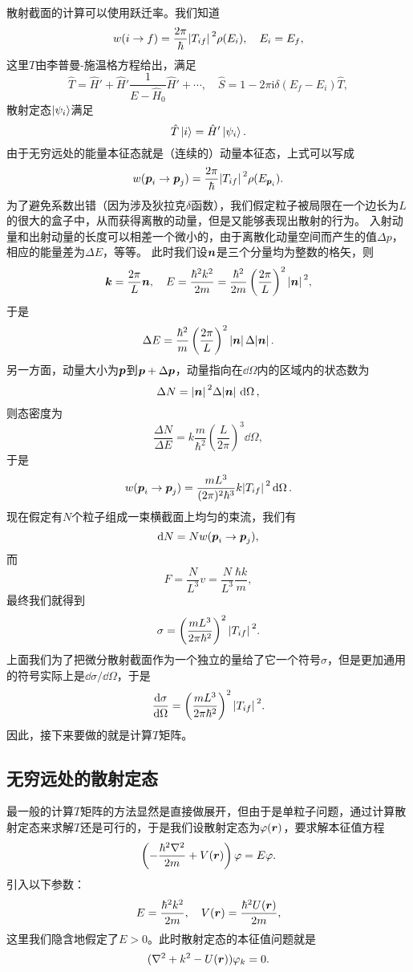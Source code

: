 \documentclass[UTF8, a4paper]{ctexart}
\newcommand*{\ii}{\mathrm{i}}
\begin{document}
散射截面的计算可以使用跃迁率。我们知道
\[
    w(i \to f) = \frac{2\pi}{\hbar} \abs*{T_{if}}^2 \rho(E_i), \quad E_i = E_f,
\]
这里$T$由李普曼-施温格方程给出，满足
\[
    \hat{T} = \hat{H}' + \hat{H}' \frac{1}{E - \hat{H}_0} \hat{H}' + \cdots, \quad \hat{S} = 1 - 2 \pi \ii \delta(E_f - E_i) \hat{T},
\]
散射定态$\ket{\psi_i}$满足
\[
    \hat{T} \ket{i} = \hat{H}' \ket{\psi_i}.
\]
由于无穷远处的能量本征态就是（连续的）动量本征态，上式可以写成
\[
    w(\vb*{p}_i \to \vb*{p}_j) = \frac{2\pi}{\hbar} \abs*{T_{if}}^2 \rho(E_{\vb*{p}_i}).
\]
为了避免系数出错（因为涉及狄拉克$\delta$函数），我们假定粒子被局限在一个边长为$L$的很大的盒子中，从而获得离散的动量，但是又能够表现出散射的行为。
入射动量和出射动量的长度可以相差一个微小的，由于离散化动量空间而产生的值$\Delta p$，相应的能量差为$\Delta E$，等等。
此时我们设$\vb*{n}$是三个分量均为整数的格矢，则
\[
    \vb*{k} = \frac{2\pi}{L} \vb*{n}, \quad E = \frac{\hbar^2 k^2}{2m} = \frac{\hbar^2}{2m} \left( \frac{2\pi}{L} \right)^2 \abs*{\vb*{n}}^2,
\]
于是
\[
    \Delta E = \frac{\hbar^2}{m} \left( \frac{2\pi}{L} \right)^2 \abs*{\vb*{n}} \Delta \abs*{\vb*{n}}.
\]
另一方面，动量大小为$\vb*{p}$到$\vb*{p}+\Delta \vb*{p}$，动量指向在$\dd{\Omega}$内的区域内的状态数为
\[
    \Delta N = \abs*{\vb*{n}}^2 \Delta \abs*{\vb*{n}} \dd{\Omega},
\]
则态密度为
\[
    \frac{\Delta N}{\Delta E} = k \frac{m}{\hbar^2} \left( \frac{L}{2\pi} \right)^3 \dd{\Omega},
\]
于是
\begin{equation}
    w(\vb*{p}_i \to \vb*{p}_j) = \frac{mL^3}{(2\pi)^2 \hbar^3} k \abs*{T_{if}}^2 \dd{\Omega}.
\end{equation}
现在假定有$N$个粒子组成一束横截面上均匀的束流，我们有
\[
    \dd{N} = N w(\vb*{p}_i \to \vb*{p}_j),
\]
而
\[
    F = \frac{N}{L^3} v = \frac{N}{L^3} \frac{\hbar k}{m},
\]
最终我们就得到
\[
    \sigma = \left( \frac{m L^3}{2\pi \hbar^2} \right)^2 \abs*{T_{if}}^2.
\]
上面我们为了把微分散射截面作为一个独立的量给了它一个符号$\sigma$，但是更加通用的符号实际上是$\dd{\sigma}/\dd{\Omega}$，于是
\begin{equation}
    \dv{\sigma}{\Omega} = \left( \frac{m L^3}{2\pi \hbar^2} \right)^2 \abs*{T_{if}}^2.
    \label{eq:cross-section-and-t}
\end{equation}
因此，接下来要做的就是计算$T$矩阵。

\subsection{无穷远处的散射定态}

最一般的计算$T$矩阵的方法显然是直接做展开，但由于是单粒子问题，通过计算散射定态来求解$T$还是可行的，于是我们设散射定态为$\varphi(\vb*{r})$，要求解本征值方程
\[
    \left( - \frac{\hbar^2 \laplacian}{2m} + V(\vb*{r}) \right) \varphi = E \varphi.
\]
引入以下参数：
\begin{equation}
    E = \frac{\hbar^2 k^2}{2m}, \quad V(\vb*{r}) = \frac{\hbar^2 U(\vb*{r})}{2m},
\end{equation}
这里我们隐含地假定了$E>0$。此时散射定态的本征值问题就是
\begin{equation}
    (\laplacian + k^2 - U(\vb*{r})) \varphi_k = 0.
    \label{eq:scattering-eigen}
\end{equation}
\end{document}
